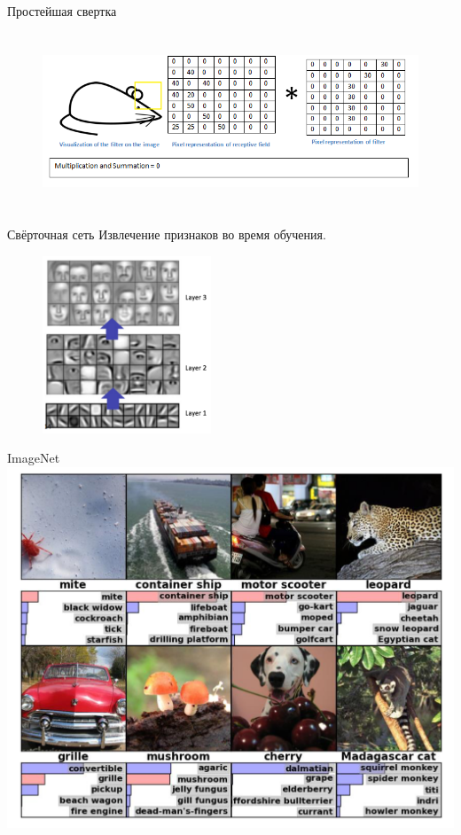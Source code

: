 \documentclass[10pt]{beamer}
\begin{document}
\begin{frame}{Простейшая свертка}
	\begin{figure}[htbp]
	  \includegraphics[height=150pt, width=\textwidth, keepaspectratio = true]{images/conv3}   
	\end{figure}
\end{frame}

{
\begin{frame}{Свёрточная сеть}
  Извлечение признаков во время обучения.\\

	\begin{figure}[htbp]
	  \includegraphics[height=150pt, keepaspectratio = true]{images/deep_learning}   
	\end{figure}
\end{frame}
}

{
\begin{frame}{ImageNet}
  \centering
  \includegraphics[width=0.9 \textwidth, keepaspectratio = true]{images/imagenet}   
\end{frame}
}
\end{document}
